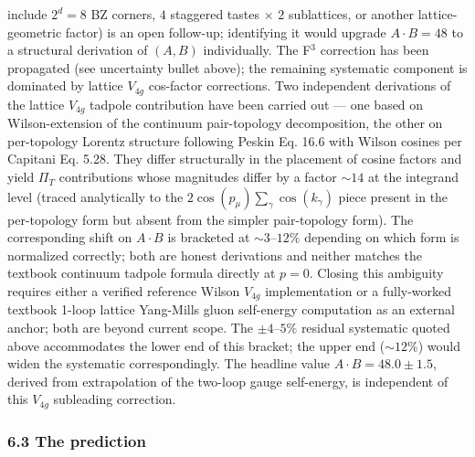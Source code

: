 \documentclass[
]{article}
\begin{document}
include \(2^d = 8\) BZ corners, \(4\) staggered tastes \(\times\) \(2\)
sublattices, or another lattice-geometric factor) is an open follow-up;
identifying it would upgrade \(A \cdot B = 48\) to a structural
derivation of \((A, B)\) individually. The F\(^3\) correction has been
propagated (see uncertainty bullet above); the remaining systematic
component is dominated by lattice \(V_{4g}\) cos-factor corrections. Two
independent derivations of the lattice \(V_{4g}\) tadpole contribution
have been carried out --- one based on Wilson-extension of the continuum
pair-topology decomposition, the other on per-topology Lorentz structure
following Peskin Eq. 16.6 with Wilson cosines per Capitani Eq. 5.28.
They differ structurally in the placement of cosine factors and yield
\(\Pi_T\) contributions whose magnitudes differ by a factor \(\sim 14\)
at the integrand level (traced analytically to the
\(2 \cos(p_\mu) \sum_\gamma \cos(k_\gamma)\) piece present in the
per-topology form but absent from the simpler pair-topology form). The
corresponding shift on \(A \cdot B\) is bracketed at
\(\sim 3\)--\(12\%\) depending on which form is normalized correctly;
both are honest derivations and neither matches the textbook continuum
tadpole formula directly at \(p = 0\). Closing this ambiguity requires
either a verified reference Wilson \(V_{4g}\) implementation or a
fully-worked textbook 1-loop lattice Yang-Mills gluon self-energy
computation as an external anchor; both are beyond current scope. The
\(\pm 4\)--\(5\%\) residual systematic quoted above accommodates the
lower end of this bracket; the upper end (\(\sim 12\%\)) would widen the
systematic correspondingly. The headline value
\(A \cdot B = 48.0 \pm 1.5\), derived from extrapolation of the two-loop
gauge self-energy, is independent of this \(V_{4g}\) subleading
correction.

\hypertarget{the-prediction}{%
\subsubsection{6.3 The prediction}\label{the-prediction}}
\end{document}
